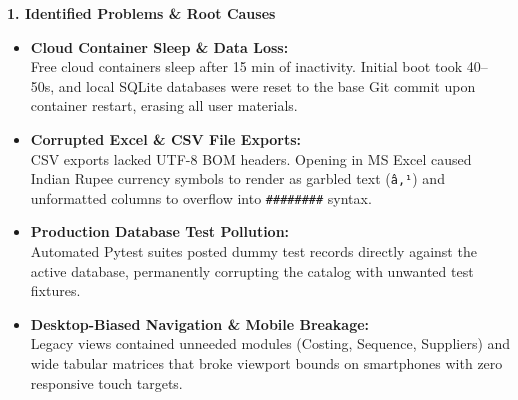 \documentclass[a4paper,10pt]{article}
\begin{document}
\begin{minipage}[t]{0.485\textwidth}
    {\small \textbf{\color{soleterracotta} 1. Identified Problems \& Root Causes}}
    \vspace{1pt}
    
    \begin{itemize}[leftmargin=*, itemsep=2.0pt, topsep=1pt]
        \item \footnotesize \textbf{Cloud Container Sleep \& Data Loss:}\\
        Free cloud containers sleep after 15 min of inactivity. Initial boot took 40–50s, and local SQLite databases were reset to the base Git commit upon container restart, erasing all user materials.
        
        \item \footnotesize \textbf{Corrupted Excel \& CSV File Exports:}\\
        CSV exports lacked UTF-8 BOM headers. Opening in MS Excel caused Indian Rupee currency symbols to render as garbled text (\texttt{â‚¹}) and unformatted columns to overflow into \texttt{\#\#\#\#\#\#\#\#} syntax.
        
        \item \footnotesize \textbf{Production Database Test Pollution:}\\
        Automated Pytest suites posted dummy test records directly against the active database, permanently corrupting the catalog with unwanted test fixtures.
        
        \item \footnotesize \textbf{Desktop-Biased Navigation \& Mobile Breakage:}\\
        Legacy views contained unneeded modules (Costing, Sequence, Suppliers) and wide tabular matrices that broke viewport bounds on smartphones with zero responsive touch targets.
    \end{itemize}
\end{minipage}
\hfill
\end{document}
